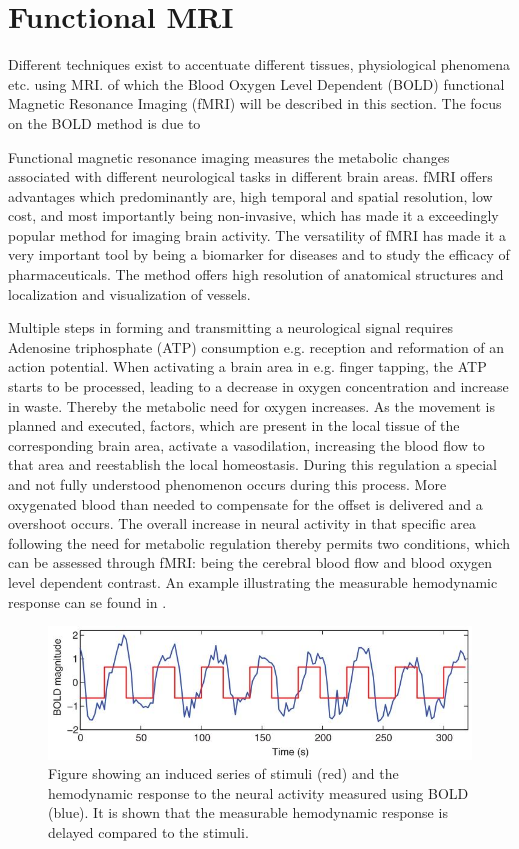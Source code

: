 \section{Functional MRI}

Different techniques exist to accentuate different tissues, physiological phenomena etc. using MRI.  of which the Blood Oxygen Level Dependent (BOLD) functional Magnetic Resonance Imaging (fMRI) will be described in this section. The focus on the BOLD method is due to  

Functional magnetic resonance imaging measures the metabolic changes associated with different neurological tasks in different brain areas. fMRI offers advantages which predominantly are, high temporal and spatial resolution, low cost, and most importantly being non-invasive, which has made it a exceedingly popular method for imaging brain activity. The versatility of fMRI has made it a very important tool by being a biomarker for diseases and to study the efficacy of pharmaceuticals. The method offers high resolution of anatomical structures and localization and visualization of vessels. \cite{Glover2011} 

Multiple steps in forming and transmitting a neurological signal requires Adenosine triphosphate (ATP) consumption e.g. reception and reformation of an action potential. When activating a brain area in e.g. finger tapping, the ATP starts to be processed, leading to a decrease in oxygen concentration and increase in waste. Thereby the metabolic need for oxygen increases. As the movement is planned and executed, factors, which are present in the local tissue of the corresponding brain area, activate a vasodilation, increasing the blood flow to that area and reestablish the local homeostasis. During this regulation a special and not fully understood phenomenon occurs during this process. More oxygenated blood than needed to compensate for the offset is delivered and a overshoot occurs. The overall increase in neural activity in that specific area following the need for metabolic regulation thereby permits two conditions, which can be assessed through fMRI: being the cerebral blood flow and blood oxygen level dependent contrast. An example illustrating the measurable hemodynamic response can se found in . \cite{Glover2011,Poldrack2011}

\begin{figure}[H]                 
	\includegraphics[width=.69\textwidth]{figures/aBackground/stimuli_vs_response}  
	\caption{Figure showing an induced series of stimuli (red) and the hemodynamic response to the neural activity measured using BOLD (blue). It is shown that the measurable hemodynamic response is delayed compared to the stimuli. \cite{Poldrack2011}}
	\label{fig:back:stim} 
\end{figure}

